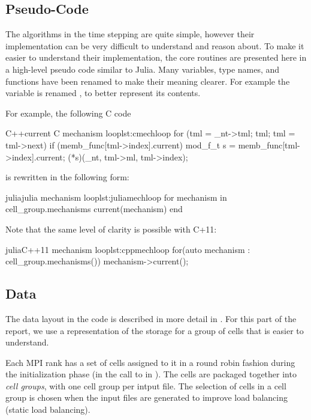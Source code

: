 \subsection{Pseudo-Code}
The algorithms in the time stepping are quite simple, however their implementation can be very difficult to understand and reason about. To make it easier to understand their implementation, the core routines are presented here in a high-level pseudo code similar to Julia. Many variables, type names, and functions have been renamed to make their meaning clearer. For example the variable  is renamed , to better represent its contents.

For example, the following C code
\begin{inlinelisting}{C++}{current C mechanism loop}{lst:cmechloop}
for (tml = _nt->tml; tml; tml = tml->next)
  if (memb_func[tml->index].current) {
    mod_f_t s = memb_func[tml->index].current;
    (*s)(_nt, tml->ml, tml->index);
  }
\end{inlinelisting}
\noindent is rewritten in the following form:
\begin{inlinelisting}{julia}{julia mechanism loop}{lst:juliamechloop}
for mechanism in cell_group.mechanisms
  current(mechanism)
end
\end{inlinelisting}

\noindent Note that the same level of clarity is possible with C+11:
\begin{inlinelisting}{julia}{C++11 mechanism loop}{lst:cppmechloop}
for(auto mechanism : cell_group.mechanisms()) {
  mechanism->current();
}
\end{inlinelisting}

\subsection{Data}
The data layout in the \neuron code is described in more detail in . For this part of the report, we use a representation of the storage for a group of cells that is easier to understand.

Each MPI rank has a set of cells assigned to it in a round robin fashion during the initialization phase (in the call to  in ).
The cells are packaged together into \emph{cell groups}, with one cell group per intput file. The selection of cells in a cell group is chosen when the input files are generated to improve load balancing (static load balancing).


